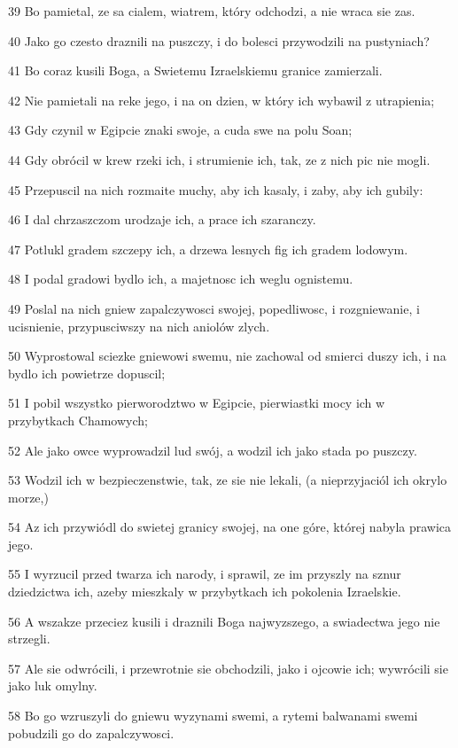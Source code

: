 \par 39 Bo pamietal, ze sa cialem, wiatrem, który odchodzi, a nie wraca sie zas.
\par 40 Jako go czesto draznili na puszczy, i do bolesci przywodzili na pustyniach?
\par 41 Bo coraz kusili Boga, a Swietemu Izraelskiemu granice zamierzali.
\par 42 Nie pamietali na reke jego, i na on dzien, w który ich wybawil z utrapienia;
\par 43 Gdy czynil w Egipcie znaki swoje, a cuda swe na polu Soan;
\par 44 Gdy obrócil w krew rzeki ich, i strumienie ich, tak, ze z nich pic nie mogli.
\par 45 Przepuscil na nich rozmaite muchy, aby ich kasaly, i zaby, aby ich gubily:
\par 46 I dal chrzaszczom urodzaje ich, a prace ich szaranczy.
\par 47 Potlukl gradem szczepy ich, a drzewa lesnych fig ich gradem lodowym.
\par 48 I podal gradowi bydlo ich, a majetnosc ich weglu ognistemu.
\par 49 Poslal na nich gniew zapalczywosci swojej, popedliwosc, i rozgniewanie, i ucisnienie, przypusciwszy na nich aniolów zlych.
\par 50 Wyprostowal sciezke gniewowi swemu, nie zachowal od smierci duszy ich, i na bydlo ich powietrze dopuscil;
\par 51 I pobil wszystko pierworodztwo w Egipcie, pierwiastki mocy ich w przybytkach Chamowych;
\par 52 Ale jako owce wyprowadzil lud swój, a wodzil ich jako stada po puszczy.
\par 53 Wodzil ich w bezpieczenstwie, tak, ze sie nie lekali, (a nieprzyjaciól ich okrylo morze,)
\par 54 Az ich przywiódl do swietej granicy swojej, na one góre, której nabyla prawica jego.
\par 55 I wyrzucil przed twarza ich narody, i sprawil, ze im przyszly na sznur dziedzictwa ich, azeby mieszkaly w przybytkach ich pokolenia Izraelskie.
\par 56 A wszakze przeciez kusili i draznili Boga najwyzszego, a swiadectwa jego nie strzegli.
\par 57 Ale sie odwrócili, i przewrotnie sie obchodzili, jako i ojcowie ich; wywrócili sie jako luk omylny.
\par 58 Bo go wzruszyli do gniewu wyzynami swemi, a rytemi balwanami swemi pobudzili go do zapalczywosci.
